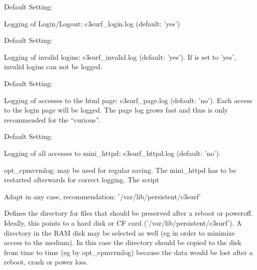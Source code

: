 \begin{itemize}
\begin{description}

  Default Setting: 

  Logging of Login/Logout: c3surf\_login.log (default: 'yes')


  Default Setting: 

  Logging of invalid logins: c3surf\_invalid.log (default: 'yes'). If
   is set to 'yes', invalid logins
  can not be logged.


  Default Setting: 

  Logging of accesses to the html page: c3surf\_page.log (default: 'no').
  Each access to the login page will be logged. The page log grows
  fast and thus is only recommended for the ``curious''.


  Default Setting: 

  Logging of all accesses to mini\_httpd: c3surf\_httpd.log (default: 'no').


  opt\_cpmvrmlog: 
  may be used for regular saving. The mini\_httpd has to be restarted afterwards
  for correct logging. The script 


  Adapt in any case, recommendation: '/var/lib/persistent/c3surf'

  Defines the directory for files that should be preserved after a reboot or poweroff.
  Ideally, this points to a hard disk or CF card ('/var/lib/persistent/c3surf'). A directory in
  the RAM disk may be selected as well (eg in order to minimize access to the medium).
  In this case the directory should be copied to the disk from time to time (eg by
  opt\_cpmvrmlog) because the data would be lost after a reboot, crash or power loss.


\end{description}
\end{itemize}
